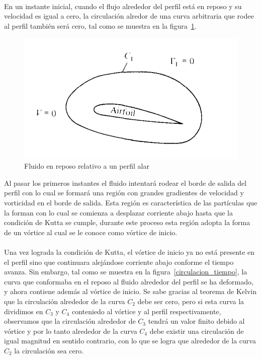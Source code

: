 \documentclass[letterpaper, openright, 12pt]{book}
\begin{document}
    \paragraph*{}
        En un instante inicial, cuando el flujo alrededor del perfil está en
        reposo y su velocidad es igual a cero, la circulación alredor de una
        curva arbitraria que rodee al perfil también será cero, tal como se
        muestra en la figura~\ref{circulacion_reposo}.

        \begin{figure}[htbp!]
            \centering
            \includegraphics[keepaspectratio, width=115mm]{./Imagenes/circulacion_reposo}
            \caption[Fluido en reposo relativo a un perfil alar]{Fluido en
                reposo relativo a un perfil alar\cite{anderson_fundamentals}}
            \label{circulacion_reposo}
        \end{figure}

        Al pasar los primeros instantes el fluido intentará rodear el borde de
        salida del perfil con lo cual se formará una región con grandes
        gradientes de velocidad y vorticidad en el borde de salida. Esta región
        es característica de las partículas que la forman con lo cual se
        comienza a desplazar corriente abajo hasta que la condición de Kutta se
        cumple, durante este proceso esta región adopta la forma de un vórtice
        al cual se le conoce como vórtice de inicio.

    \paragraph*{}
        Una vez lograda la condición de Kutta, el vórtice de inicio ya no está
        presente en el perfil sino que continuara alejándose corriente abajo
        conforme el tiempo avanza. Sin embargo, tal como se muestra en la
        figura~\ref{circulacion_tiempo}, la curva que conformaba en el reposo al fluido
        alrededor del perfil se ha deformado, y ahora contiene además al
        vórtice de inicio. Se sabe gracias al teorema de Kelvin que la
        circulación alrededor de la curva $C_2$ debe ser cero, pero si esta
        curva la dividimos en $C_3$ y $C_4$ conteniedo al vórtice y al perfil
        respectivamente, observamos que la circulación alrededor de $C_3$ tendrá
        un valor finito debido al vórtice y por lo tanto alrededor de la curva
        $C_4$ debe existir una circulación de igual magnitud en sentido
        contrario, con lo que se logra que alrededor de la curva $C_2$ la
        circulación sea cero.
\end{document}
